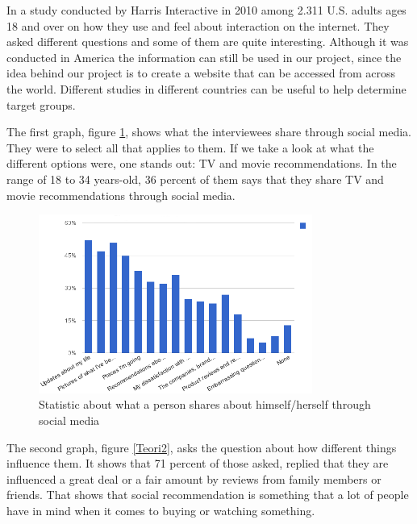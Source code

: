 In a study conducted by Harris Interactive \cite{Harris} in 2010 among 2.311 U.S. adults ages 18 and over on how they use and feel about interaction on the internet. They asked different questions and some of them are quite interesting.
Although it was conducted in America the information can still be used in our project, since the idea behind our project is to create a website that can be accessed from across the world. Different studies in different countries can be useful to help determine target groups.

The first graph, figure \ref{Teori1}, shows what the interviewees share through social media. They were to select all that applies to them. If we take a look at what the different options were, one stands out: TV and movie recommendations. In the range of 18 to 34 years-old, 36 percent of them says that they share TV and movie recommendations through social media.

\begin{figure}[H]
\centering
\includegraphics[width=0.8\textwidth]{Images/teori1.png}
\caption{Statistic about what a person shares about himself/herself through social media}
\label{Teori1}
\end{figure}


The second graph, figure \ref{Teori2}, asks the question about how different things influence them. It shows that 71 percent of those asked, replied that they are influenced a great deal or a fair amount by reviews from family members or friends. That shows that social recommendation is something that a lot of people have in mind when it comes to buying or watching something.

